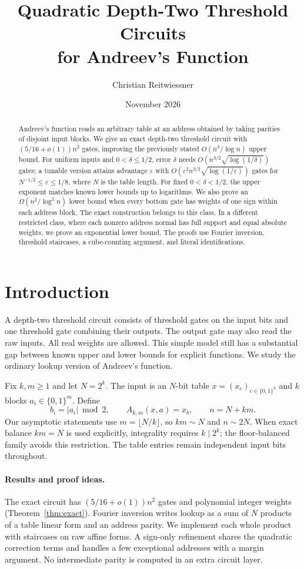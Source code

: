 \documentclass[11pt]{article}
\title{Quadratic Depth-Two Threshold Circuits\\for Andreev's Function}
\author{Christian Reitwiessner}
\date{November 2026}
\newcommand{\bits}{\{0,1\}}
\begin{document}
\maketitle
\begin{abstract}
Andreev's function reads an arbitrary table at an address obtained by taking
parities of disjoint input blocks. We give an exact depth-two threshold
circuit with $(5/16+o(1))n^2$ gates, improving the previously stated
$O(n^3/\log n)$ upper bound. For uniform inputs and $0<\delta\le1/2$, error $\delta$ needs
$O(n^{3/2}\sqrt{\log(1/\delta)})$ gates; a tunable version attains advantage
$\varepsilon$ with $O(\varepsilon^2n^{3/2}\sqrt{\log(1/\varepsilon)})$ gates
for $N^{-1/2}\le\varepsilon\le1/8$, where $N$ is the table length.
For fixed $0<\delta<1/2$, the upper exponent matches known lower bounds up to
logarithms. We also prove an $\Omega(n^2/\log^3n)$ lower bound when every
bottom gate has weights of one sign within each address block. The exact
construction belongs to this class. In a different restricted class, where
each nonzero address normal has full support and equal absolute weights,
we prove an exponential lower bound. The proofs use Fourier inversion,
threshold staircases, a cube-counting argument, and literal identifications.
\end{abstract}

\section{Introduction}
A depth-two threshold circuit consists of threshold gates on the input bits
and one threshold gate combining their outputs. The output gate may also
read the raw inputs. All real weights are allowed. This simple model still
has a substantial gap between known upper and lower bounds for explicit
functions. We study the ordinary lookup version of Andreev's function.

Fix $k,m\ge1$ and let $N=2^k$. The input is an $N$-bit table
$x=(x_c)_{c\in\bits^k}$ and $k$ blocks $a_i\in\bits^m$. Define
$$b_i=|a_i|\bmod2,\qquad A_{k,m}(x,a)=x_b,\qquad n=N+km.$$
Our asymptotic statements use $m=\lfloor N/k\rfloor$, so $km\sim N$ and
$n\sim2N$. When exact balance $km=N$ is used explicitly, integrality
requires $k\mid2^k$; the floor-balanced family avoids this restriction.
The table entries remain independent input bits throughout.

\paragraph{Results and proof ideas.}
The exact circuit has $(5/16+o(1))n^2$ gates and polynomial integer weights
(Theorem~\ref{thm:exact}). Fourier inversion writes lookup as a sum of $N$
products of a table linear form and an address parity. We implement each
whole product with staircases on raw affine forms. A sign-only refinement
shares the quadratic correction terms and handles a few exceptional
addresses with a margin argument. No intermediate parity is computed in
an extra circuit layer.
\end{document}
